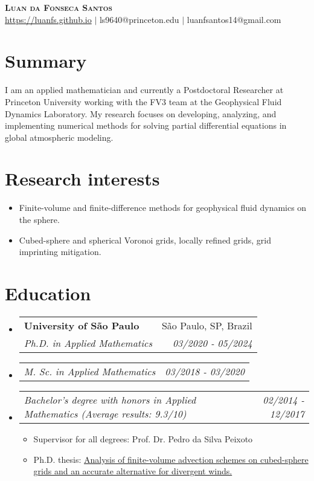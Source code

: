 \documentclass[letterpaper,11pt]{article}
\makeatletter
\newcommand{\resumeSubheading}[4]{
  \vspace{-2pt}\item
    \begin{tabular*}{0.97\textwidth}[t]{l@{\extracolsep{\fill}}r}
      \textbf{#1} & #2 \\
      \textit{\small#3} & \textit{\small #4} \\
    \end{tabular*}\vspace{-7pt}
}
\newcommand{\resumeSubSubheading}[2]{
    \item
    \begin{tabular*}{0.97\textwidth}{l@{\extracolsep{\fill}}r}
      \textit{\small#1} & \textit{\small #2} \\
    \end{tabular*}\vspace{-7pt}
}
\newcommand{\resumeSubHeadingListStart}{\begin{itemize}[leftmargin=0.15in, label={}]}
\newcommand{\resumeSubHeadingListEnd}{\end{itemize}}
\makeatother
\begin{document}
\begin{center}
    \textbf{\Huge \scshape Luan da Fonseca Santos} \\ \vspace{1pt}
    \href{https://luanfs.github.io}{https://luanfs.github.io} $|$
    ls9640@princeton.edu
    $|$  
    {luanfsantos14@gmail.com} 
\end{center}

\section{Summary}
I am an applied mathematician and currently a Postdoctoral Researcher at Princeton University working with the FV3 team at the Geophysical Fluid Dynamics Laboratory.
My research focuses on developing, analyzing, and implementing  numerical methods for solving partial differential equations in global atmospheric modeling.

\section{Research interests}
\begin{itemize}
	\item Finite-volume and finite-difference methods for geophysical fluid dynamics on the sphere.
	\item Cubed-sphere and spherical Voronoi grids, locally refined grids, grid imprinting mitigation.
\end{itemize}

\section{Education}
\resumeSubHeadingListStart
\resumeSubheading
{University of São Paulo }{São Paulo, SP, Brazil}
{Ph.D. in Applied Mathematics}{03/2020 - 05/2024}  

\resumeSubSubheading{M. Sc. in Applied Mathematics}{03/2018 - 03/2020}

\resumeSubSubheading{Bachelor's degree with honors in Applied Mathematics (Average results: 9.3/10)}{02/2014 - 12/2017}
\begin{itemize}
	\item Supervisor for all degrees: Prof. Dr. Pedro da Silva Peixoto
	\item Ph.D. thesis: \href{https://www.teses.usp.br/teses/disponiveis/45/45132/tde-29052024-125153/en.php}{Analysis of finite-volume advection
	schemes on cubed-sphere grids and an
	accurate alternative for divergent winds.}
\end{itemize}
\resumeSubHeadingListEnd
\end{document}
